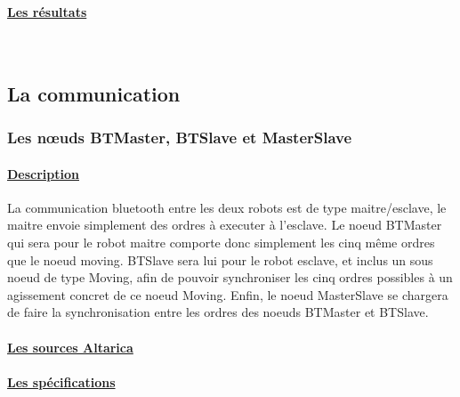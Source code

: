     \paragraph{\underline{Les résultats\\}}
    
    
    ~\newline
    
    
    
  \subsection{La communication}
    
   \subsubsection{Les n\oe{}uds BTMaster, BTSlave et MasterSlave}
    
    \paragraph{\underline{Description\\}}
    La communication bluetooth entre les deux robots est de type
    maitre/esclave, le maitre envoie simplement des ordres à executer à
    l'esclave. Le noeud BTMaster qui sera pour le robot maitre comporte
    donc simplement les cinq même ordres que le noeud moving. BTSlave
    sera lui pour le robot esclave, et inclus un sous noeud de type
    Moving, afin de pouvoir synchroniser les cinq ordres possibles à un
    agissement concret de ce noeud Moving. Enfin, le noeud MasterSlave se
    chargera de faire la synchronisation entre les ordres des noeuds
    BTMaster et BTSlave.

    \paragraph{\underline{Les sources Altarica\\}}
    
    
    
    
    \paragraph{\underline{Les spécifications\\}}
    
    
    

